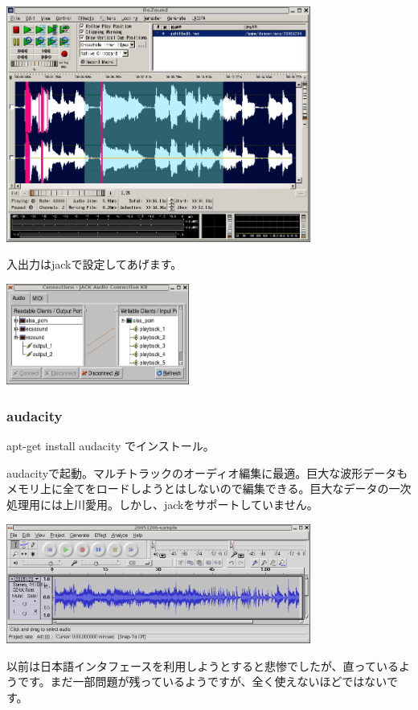\documentclass[mingoth,a4paper]{jsarticle}
\begin{document}
\includegraphics[width=10cm]{image200602/rezound-5.png}

入出力はjackで設定してあげます。

\includegraphics[width=6cm]{image200602/rezound-6.png}

\subsubsection{audacity}

apt-get install audacity でインストール。

audacityで起動。マルチトラックのオーディオ編集に最適。巨大な波形データも
メモリ上に全てをロードしようとはしないので編集できる。巨大なデータの一次
処理用には上川愛用。しかし、jackをサポートしていません。

\includegraphics[width=10cm]{image200602/audacity.png}

以前は日本語インタフェースを利用しようとすると悲惨でしたが、直っているよ
うです。まだ一部問題が残っているようですが、全く使えないほどではないです。
\end{document}
